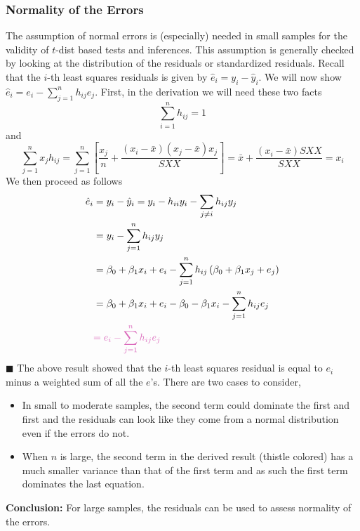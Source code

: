 \documentclass[11pt]{article}
\begin{document}
\subsubsection{Normality of the Errors}
The assumption of normal errors is (especially) needed in small samples for the validity of $t$-dist based tests and inferences. This assumption is generally checked by looking at the distribution of the residuals or standardized residuals. Recall that the $i$-th least squares residuals is given by $\hat{e}_{i}=y_{i}-\hat{y}_{i}$. We will now show $\hat{e}_{i}=e_{i}-\sum_{j=1}^{n} h_{i j} e_{j}$. First, in the derivation we will need these two facts
\begin{equation*}
    \sum_{i=1}^{n} h_{i j}=1
\end{equation*}
and 
\begin{equation*}
    \sum_{j=1}^{n} x_{j} h_{i j}=\sum_{j=1}^{n}\left[\frac{x_{j}}{n}+\frac{\left(x_{i}-\bar{x}\right)\left(x_{j}-\bar{x}\right) x_{j}}{S X X}\right]=\bar{x}+\frac{\left(x_{i}-\bar{x}\right) S X X}{S X X}=x_{i}
\end{equation*}
We then proceed as follows
\begin{align*} 
    \hat{e}_{i} &=y_{i}-\hat{y}_{i} =y_{i}-h_{i i} y_{i}-\sum_{j \neq i} h_{i j} y_{j} \\ 
    &=y_{i}-\sum_{j=1}^{n} h_{i j} y_{j} \\ 
    &=\beta_{0}+\beta_{1} x_{i}+e_{i}-\sum_{j=1}^{n} h_{i j}\left(\beta_{0}+\beta_{1} x_{j}+e_{j}\right) \\ 
    &=\beta_{0}+\beta_{1} x_{i}+e_{i}-\beta_{0}-\beta_{1} x_{i}-\sum_{j=1}^{n} h_{i j} e_{j} \\ 
    &\color{Thistle}{=e_{i}-\sum_{j=1}^{n} h_{i j} e_{j}}
\end{align*}
\hfill $\blacksquare$ \newline
The above result showed that the $i$-th least squares residual is equal to $e_i$ minus a weighted sum of all the $e$'s. There are two cases to consider,
\begin{itemize}
    \item In small to moderate samples, the second term could dominate the first and first and the residuals can look like they come from a normal distribution even if the errors do not. 
    \item When $n$ is large, the second term in the derived result (thistle colored) has a much smaller variance than that of the first term and as such the first term dominates the last equation. 
\end{itemize}
\textbf{Conclusion:} For large samples, the residuals can be used to assess normality of the errors.
\end{document}
